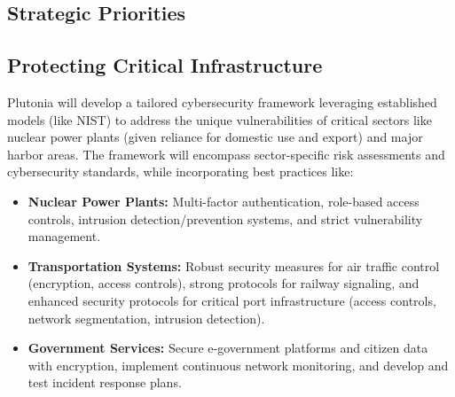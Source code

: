 \documentclass[
	a4paper, %
	10pt, %
]{CSSullivanBusinessReport}
\begin{document}
\begin{fullwidth}
\begin{justify}
\section{Strategic Priorities}
\subsection{Protecting Critical Infrastructure}
Plutonia will develop a tailored cybersecurity framework leveraging established models (like NIST) to address the unique vulnerabilities of critical sectors like nuclear power plants (given reliance for domestic use and export) and major harbor areas. The framework will encompass sector-specific risk assessments and cybersecurity standards, while incorporating best practices like:
\begin{itemize}
	\item \textbf{Nuclear Power Plants:} Multi-factor authentication, role-based access controls, intrusion detection/prevention systems, and strict vulnerability management.
	\item \textbf{Transportation Systems:} Robust security measures for air traffic control (encryption, access controls), strong protocols for railway signaling, and enhanced security protocols for critical port infrastructure (access controls, network segmentation, intrusion detection).
	\item \textbf{Government Services:} Secure e-government platforms and citizen data with encryption, implement continuous network monitoring, and develop and test incident response plans.
\end{itemize}

\end{justify}
\end{fullwidth}
\end{document}

